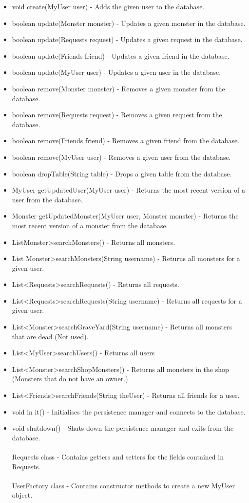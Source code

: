 \documentclass[titlepage]{article}
\begin{document}
{\begin{itemize}
\item {void create(MyUser user) - Adds the given user to the database.}
\item {boolean update(Monster monster) - Updates a given monster in the database.}
\item {boolean update(Requests request) - Updates a given request in the database.}
\item {boolean update(Friends friend) - Updates a given friend in the database.}
\item {boolean update(MyUser user) - Updates a given user in the database.}
\item {boolean remove(Monster monster) - Removes a given monster from the database.}
\item {boolean remove(Requests request) - Removes a given request from the database.}
\item {boolean remove(Friends friend) - Removes a given friend from the database.}
\item {boolean remove(MyUser user) - Removes a given user from the database.}
\item {boolean dropTable(String table) - Drops a given table from the database.}
\item {MyUser getUpdatedUser(MyUser user) - Returns the most recent version of a user from the database.}
\item {Monster getUpdatedMonster(MyUser user, Monster monster) - Returns the most recent version of a monster from the database.}
\item {ListMonster\textgreater searchMonsters() - Returns all monsters.}
\item {List Monster\textgreater searchMonsters(String username) - Returns all monsters for a given user.}
\item {List\textless Requests\textgreater searchRequests() - Returns all requests.}
\item {List\textless Requests\textgreater searchRequests(String username) - Returns all requests for a given user.}
\item {List\textless Monster\textgreater searchGraveYard(String username) - Returns all monsters that are dead (Not used).}
\item {List\textless MyUser\textgreater searchUsers() - Returns all users}
\item {List\textless Monster\textgreater searchShopMonsters() - Returns all monsters in the shop (Monsters that do not have an owner.)}
\item {List\textless Friends\textgreater searchFriends(String theUser) - Returns all friends for a user.}
\item {void in it() - Initialises the persistence manager and connects to the database.}
\item {void shutdown() - Shuts down the persistence manager and exits from the database.}
\\
\\
Requests class - Contains getters and setters for the fields contained in Requests.
\\
\\
UserFactory class - Contains constructor methods to create a new MyUser object.
\end{itemize}
}
\end{document}
